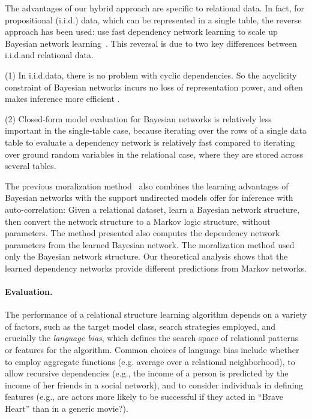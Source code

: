 \documentclass[runningheads,a4paper]{llncs}
\newcommand{\iid}{i.i.d.}
\begin{document}
The advantages  of our hybrid approach are specific to relational data. In fact, for propositional (\iid) data, which can be represented in a single table, the reverse approach has been used: use fast dependency network learning to scale up Bayesian network learning~\cite{Hulten2003}. This reversal is due to two key differences between \iid and relational data. 

(1) In \iid data, there is no problem with cyclic dependencies. 
So the acyclicity constraint of Bayesian networks incurs no loss of representation power, and often  makes inference more efficient \cite{Hulten2003}. 

(2) Closed-form model evaluation for Bayesian networks is relatively less important in the single-table case, because iterating over the rows of a single data table to evaluate a dependency network is relatively fast compared to iterating over ground random variables in the relational case, where they are stored across several tables. 

The previous moralization method~\cite{Khosravi2010,Schulte2012} also combines the learning advantages of Bayesian networks with the support undirected models offer for inference with auto-correlation: Given a relational dataset, learn a Bayesian network structure, then convert the network structure to a Markov logic structure, without parameters. 
The method presented also computes the dependency network parameters from the learned Bayesian network. The moralization method used only the Bayesian network structure. Our theoretical analysis shows that the learned dependency networks provide different predictions from Markov networks. 

\paragraph{Evaluation.} The performance of a relational structure learning algorithm depends on a variety of factors, such as the target model class, search strategies employed, and crucially the {\em language bias}, which defines the search space of relational patterns or features for the algorithm. Common choices of language bias include whether to employ aggregate functions (e.g. average over a relational neighborhood), to allow recursive dependencies (e.g., the income of a person is predicted by the income of her friends in a social network), and to consider individuals in defining features (e.g., are actors more likely to be successful if they acted in ``Brave Heart'' than in a generic movie?). 
\end{document}
